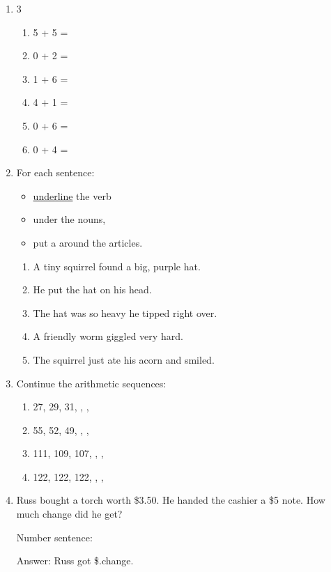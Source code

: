 \documentclass{tufte-book}
\begin{document}
\begin{enumerate}
  \item
  \begin{multicols}{3}
    \begin{enumerate}\bigskip
      \item 5 + 5 = \dotfill\bigskip
      \item 0 + 2 = \dotfill
      \item 1 + 6 = \dotfill\bigskip
      \item 4 + 1 = \dotfill
      \item 0 + 6 = \dotfill\bigskip
      \item 0 + 4 = \dotfill
    \end{enumerate}
  \end{multicols}

  \item For each sentence:
  \begin{itemize}
  \item \underline{underline} the verb
  \item {} under the nouns,
  \item put a  around the articles.
  \end{itemize}
  \begin{enumerate}
    \item A tiny squirrel found a big, purple hat.
    \item He put the hat on his head.
    \item The hat was so heavy he tipped right over.
    \item A friendly worm giggled very hard.
    \item The squirrel just ate his acorn and smiled.
\end{enumerate}

\item Continue the arithmetic sequences:
\begin{enumerate}\bigskip
  \item 27, 29, 31, \dotfill, \dotfill, \dotfill\bigskip
  \item 55, 52, 49, \dotfill, \dotfill, \dotfill\bigskip
  \item 111, 109, 107, \dotfill, \dotfill, \dotfill\bigskip
  \item 122, 122, 122, \dotfill, \dotfill, \dotfill
\end{enumerate}

\item Russ bought a torch worth \$3.50. He handed the cashier a \$5 note.
How much change did he get?\bigskip\par
Number sentence: \dotfill\bigskip\par
Answer: Russ got \$\dotfill.\dotfill\bigskip change.
\end{enumerate}
\end{document}
